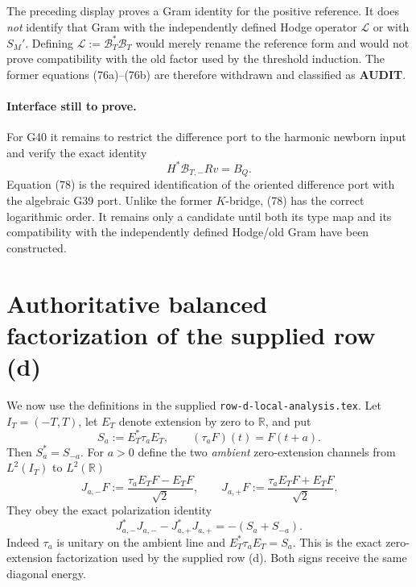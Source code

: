 \documentclass[11pt]{article}
\newcommand{\AUDIT}{\textcolor{orange!75!black}{\textbf{AUDIT}}}
\newcommand{\cL}{\mathscr L}
\begin{document}
The preceding display proves a Gram identity for the positive reference.
It does \emph{not} identify that Gram with the independently defined Hodge
operator $\cL$ or with $S_M'$.  Defining $\cL:=\mathcal B_T^*\mathcal B_T$
would merely rename the reference form and would not prove compatibility
with the old factor used by the threshold induction.  The former equations
(76a)--(76b) are therefore withdrawn and classified as \AUDIT{}.

\paragraph{Interface still to prove.}
For G40 it remains to restrict the difference port to the harmonic newborn
input and verify the exact identity
\begin{equation}
 H^*\mathcal B_{T,-}Rv=B_Q.                              \tag{78}
\end{equation}
Equation (78) is the required identification of the
oriented difference port with the algebraic G39 port.  Unlike the former
$K$-bridge, (78) has the correct logarithmic order.  It remains only a
candidate until both its type map and its compatibility with the independently
defined Hodge/old Gram have been constructed.

\section{Authoritative balanced factorization of the supplied row (d)}

We now use the definitions in the supplied
\texttt{row-d-local-analysis.tex}.  Let $I_T=(-T,T)$, let $E_T$ denote
extension by zero to $\mathbb R$, and put
\[
 S_a:=E_T^*\tau_aE_T,
 \qquad (\tau_aF)(t)=F(t+a).
\]
Then $S_a^*=S_{-a}$.  For $a>0$ define the two \emph{ambient}
zero-extension channels from $L^2(I_T)$ to $L^2(\mathbb R)$
\begin{equation}
 J_{a,-}F:=\frac{\tau_aE_TF-E_TF}{\sqrt2},
 \qquad J_{a,+}F:=\frac{\tau_aE_TF+E_TF}{\sqrt2}.     \tag{79}
\end{equation}
They obey the exact polarization identity
\begin{equation}
 J_{a,-}^*J_{a,-}-J_{a,+}^*J_{a,+}
 =-(S_a+S_{-a}).                                      \tag{80}
\end{equation}
Indeed $\tau_a$ is unitary on the ambient line and
$E_T^*\tau_aE_T=S_a$.  This is the exact zero-extension factorization used
by the supplied row (d).  Both signs receive the same diagonal energy.
\end{document}
